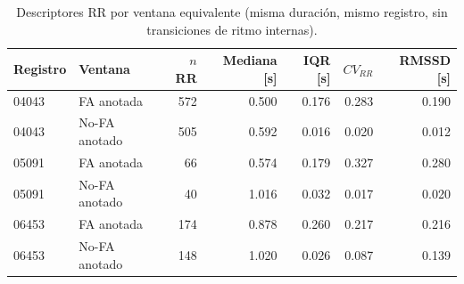 \begin{table}[h]
  \centering
  \caption{Descriptores RR por ventana equivalente (misma duración,
  mismo registro, sin transiciones de ritmo internas).}
  \begin{tabular}{llrrrrr}
    \toprule
    Registro & Ventana & $n$ RR & Mediana [s] & IQR [s] & $CV_{RR}$ & RMSSD [s] \\
    \midrule
    04043 & FA anotada & 572 & 0.500 & 0.176 & 0.283 & 0.190 \\
    04043 & No-FA anotado & 505 & 0.592 & 0.016 & 0.020 & 0.012 \\
    05091 & FA anotada & 66 & 0.574 & 0.179 & 0.327 & 0.280 \\
    05091 & No-FA anotado & 40 & 1.016 & 0.032 & 0.017 & 0.020 \\
    06453 & FA anotada & 174 & 0.878 & 0.260 & 0.217 & 0.216 \\
    06453 & No-FA anotado & 148 & 1.020 & 0.026 & 0.087 & 0.139 \\
    \bottomrule
  \end{tabular}
\end{table}
